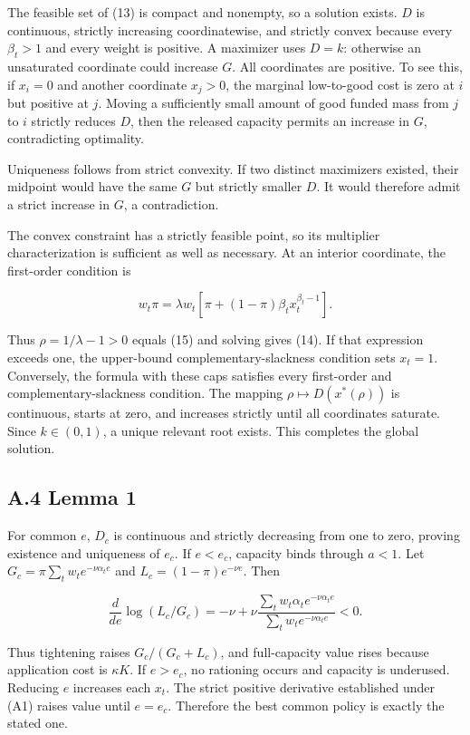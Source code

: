 \documentclass[
  11pt,
]{article}
\begin{document}
The feasible set of (13) is compact and nonempty, so a solution exists.
\(D\) is continuous, strictly increasing coordinatewise, and strictly
convex because every \(\beta_t>1\) and every weight is positive. A
maximizer uses \(D=k\): otherwise an unsaturated coordinate could
increase \(G\). All coordinates are positive. To see this, if \(x_i=0\)
and another coordinate \(x_j>0\), the marginal low-to-good cost is zero
at \(i\) but positive at \(j\). Moving a sufficiently small amount of
good funded mass from \(j\) to \(i\) strictly reduces \(D\), then the
released capacity permits an increase in \(G\), contradicting
optimality.

Uniqueness follows from strict convexity. If two distinct maximizers
existed, their midpoint would have the same \(G\) but strictly smaller
\(D\). It would therefore admit a strict increase in \(G\), a
contradiction.

The convex constraint has a strictly feasible point, so its multiplier
characterization is sufficient as well as necessary. At an interior
coordinate, the first-order condition is

\[w_t\pi=\lambda w_t[\pi+(1-\pi)\beta_t x_t^{\beta_t-1}].\]

Thus \(\rho=1/\lambda-1>0\) equals (15) and solving gives (14). If that
expression exceeds one, the upper-bound complementary-slackness
condition sets \(x_t=1\). Conversely, the formula with these caps
satisfies every first-order and complementary-slackness condition. The
mapping \(\rho\mapsto D(x^*(\rho))\) is continuous, starts at zero, and
increases strictly until all coordinates saturate. Since \(k\in(0,1)\),
a unique relevant root exists. This completes the global solution.

\subsection{A.4 Lemma 1}\label{a.4-lemma-1}

For common \(e\), \(D_c\) is continuous and strictly decreasing from one
to zero, proving existence and uniqueness of \(e_c\). If \(e<e_c\),
capacity binds through \(a<1\). Let
\(G_c=\pi\sum_tw_te^{-\nu\alpha_t e}\) and \(L_c=(1-\pi)e^{-\nu e}\).
Then

\[\frac{d}{de}\log(L_c/G_c)
=-\nu+\nu\frac{\sum_t w_t\alpha_t e^{-\nu\alpha_t e}}
{\sum_t w_t e^{-\nu\alpha_t e}}<0.\]

Thus tightening raises \(G_c/(G_c+L_c)\), and full-capacity value rises
because application cost is \(\kappa K\). If \(e>e_c\), no rationing
occurs and capacity is underused. Reducing \(e\) increases each \(x_t\).
The strict positive derivative established under (A1) raises value until
\(e=e_c\). Therefore the best common policy is exactly the stated one.
\end{document}
